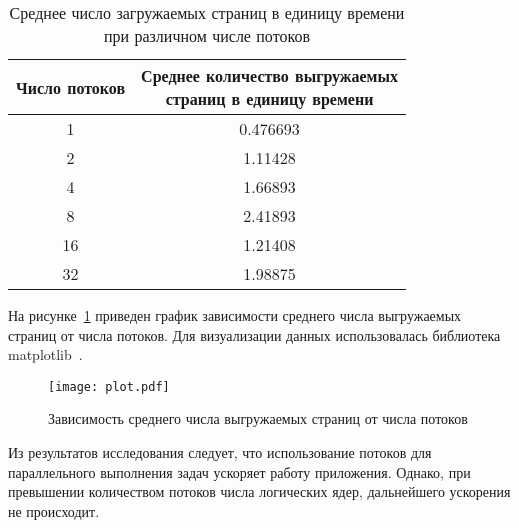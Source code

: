 \begin{table}[H]
	\caption{Среднее число загружаемых страниц в единицу времени при различном числе потоков}
	\centering
	\begin{tabular}{|c|c|}
		\hline
		Число потоков & \shortstack{Среднее количество выгружаемых\\ страниц в единицу времени}\\
		\hline
		1 & 0.476693\\\hline
		2 & 1.11428\\\hline
		4 & 1.66893\\\hline
		8 & 2.41893\\\hline
		16 & 1.21408\\\hline
		32 & 1.98875\\\hline
	\end{tabular}
	\label{tab:all_times}
\end{table}

На рисунке~\ref{fig:plot} приведен график зависимости среднего числа выгружаемых страниц от числа потоков. Для визуализации данных использовалась библиотека matplotlib~\cite{plt}.

\begin{figure}[H]
	\centering
	\texttt{[image: plot.pdf]}
	\caption{Зависимость среднего числа выгружаемых страниц от числа потоков}
	\label{fig:plot}
\end{figure}

Из результатов исследования следует, что использование потоков для параллельного выполнения задач ускоряет работу приложения. Однако, при превышении количеством потоков числа логических ядер, дальнейшего ускорения не происходит. 
\clearpage
